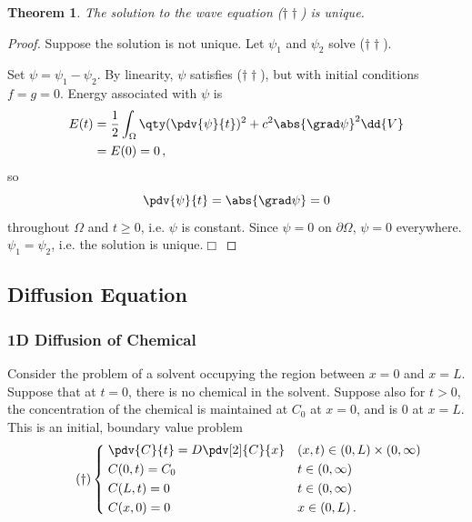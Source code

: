 \documentclass{article}
\theoremstyle{plain}\theoremheaderfont{\normalfont\itshape}\theorembodyfont{\rmfamily}\theoremseparator{.}\newtheorem*{rem}{Remark}\newtheorem*{ex}{Example}\newtheorem*{proof}{Proof}\newtheorem*{altp}{Alternative proof}
\theoremstyle{plain}\theoremheaderfont{\normalfont\bfseries}\theorembodyfont{\rmfamily}\theoremseparator{.}\newtheorem{thm}{Theorem}[section]\newtheorem{lem}[thm]{Lemma}\newtheorem{prop}[thm]{Proposition}\newtheorem*{cor}{Corollary}\newtheorem{defn}[thm]{Definition}\newtheorem{clm}[thm]{Claim}\newtheorem{clminproof}{Claim}
\theoremstyle{break}\theoremheaderfont{\normalfont\itshape}\theorembodyfont{\rmfamily}\theoremseparator{.\medskip}\newtheorem*{proofskip}{Proof}\newtheorem*{exs}{Examples}\newtheorem*{rems}{Remarks}
\theoremstyle{break}\theoremheaderfont{\normalfont\bfseries}\theorembodyfont{\rmfamily}\theoremseparator{.\medskip}\newtheorem{lemskip}[thm]{Lemma}\newtheorem{defnskip}[thm]{Definition}\newtheorem{propskip}[thm]{Proposition}\newtheorem{thmskip}[thm]{Theorem}
\numberwithin{equation}{section}
\newcommand{\qed}{\hfill\ensuremath{\Box}}
\begin{document}
	\begin{thm}
		The solution to the wave equation (\(\dagger\dagger\)) is unique.
	\end{thm}
	\begin{proof}
		Suppose the solution is not unique. Let \(\psi_1\) and \(\psi_2\) solve (\(\dagger\dagger\)).

		Set \(\psi=\psi_1-\psi_2\). By linearity, \(\psi\) satisfies (\(\dagger\dagger\)), but with initial conditions \(f=g=0\). Energy associated with \(\psi\) is
		\begin{align*}
			E(t)&=\frac{1}{2}\int_\Omega \qty(\pdv{\psi}{t})^2+c^2\abs{\grad\psi}^2\dd{V}\\
			&=E(0)=0\,,
		\end{align*}
		so
		\[\pdv{\psi}{t}=\abs{\grad\psi}=0\]
		throughout \(\Omega\) and \(t\ge 0\), i.e. \(\psi\) is constant. Since \(\psi=0\) on \(\partial\Omega\), \(\psi=0\) everywhere. \(\psi_1=\psi_2\), i.e. the solution is unique.\qed 
	\end{proof}
	
	\subsection{Diffusion Equation}
	\subsubsection{1D Diffusion of Chemical}
	Consider the problem of a solvent occupying the region between \(x=0\) and \(x=L\). Suppose that at \(t=0\), there is no chemical in the solvent. Suppose also for \(t>0\), the concentration of the chemical is maintained at \(C_0\) at \(x=0\), and is \(0\) at \(x=L\). This is an initial, boundary value problem
	\begin{equation}\tag{\(\dagger\)}
		\left\{\begin{aligned}
			& \;\pdv{C}{t}=D\pdv[2]{C}{x} && (x,t)\in(0,L)\times(0,\infty)\\
			& \;C(0,t)=C_0 && t\in(0,\infty)\\
			& \;C(L,t)=0 && t\in(0,\infty)\\
			& \;C(x,0)=0 && x\in(0,L)\,.
		\end{aligned}\right.
	\end{equation}
\end{document}
